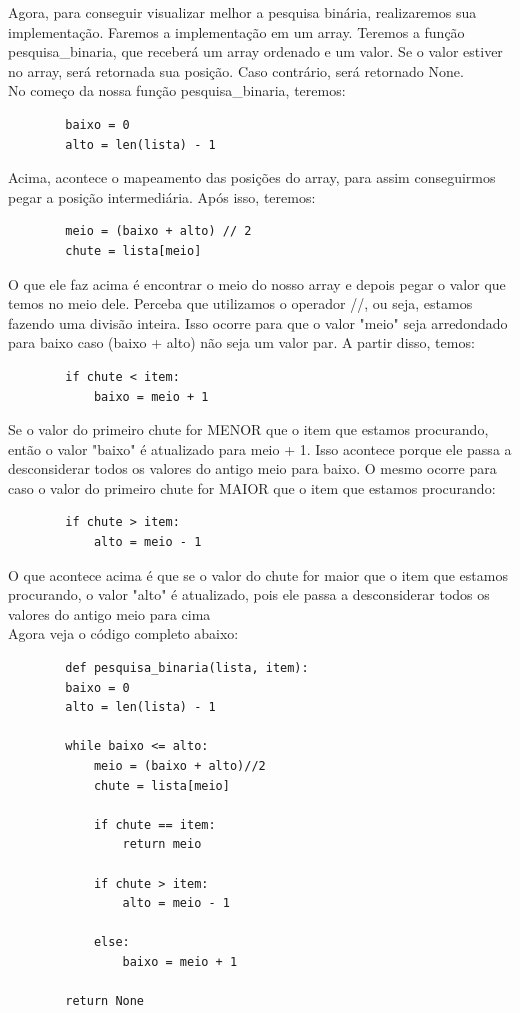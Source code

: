 \documentclass{report}
\begin{document}
	Agora, para conseguir visualizar melhor a pesquisa binária, realizaremos sua implementação. Faremos a implementação em um array. Teremos a função pesquisa\_binaria, que receberá um array ordenado e um valor. Se o valor estiver no array, será retornada sua posição. Caso contrário, será retornado None.\\
	
	No começo da nossa função pesquisa\_binaria, teremos:
	
	\begin{verbatim}
		baixo = 0
		alto = len(lista) - 1
	\end{verbatim}
	
	Acima, acontece o mapeamento das posições do array, para assim conseguirmos pegar a posição intermediária. Após isso, teremos: 
	
		
	\begin{verbatim}
		meio = (baixo + alto) // 2
		chute = lista[meio]
	\end{verbatim}
	
	O que ele faz acima é encontrar o meio do nosso array e depois pegar o valor que temos no meio dele. Perceba que utilizamos o operador //, ou seja, estamos fazendo uma divisão inteira. Isso ocorre para que o valor "meio" seja arredondado para baixo caso (baixo + alto) não seja um valor par. A partir disso, temos:
	
	\begin{verbatim}
		if chute < item:
			baixo = meio + 1
	\end{verbatim}
	
	Se o valor do primeiro chute for MENOR que o item que estamos procurando, então o valor "baixo" é atualizado para meio + 1. Isso acontece porque ele passa a desconsiderar todos os valores do antigo meio para baixo. O mesmo ocorre para caso o valor do primeiro chute for MAIOR que o item que estamos procurando:
	
	\begin{verbatim}
		if chute > item:
			alto = meio - 1
	\end{verbatim}
	
	O que acontece acima é que se o valor do chute for maior que o item que estamos procurando, o valor "alto" é atualizado, pois ele passa a desconsiderar todos os valores do antigo meio para cima \\
	
	
	Agora veja o código completo abaixo:
	
	\begin{verbatim}
		def pesquisa_binaria(lista, item):
		baixo = 0
		alto = len(lista) - 1
		
		while baixo <= alto:
			meio = (baixo + alto)//2
			chute = lista[meio]
			
			if chute == item:
				return meio
			
			if chute > item:
				alto = meio - 1
			
			else:
				baixo = meio + 1
		
		return None
	\end{verbatim}
	
\end{document}
